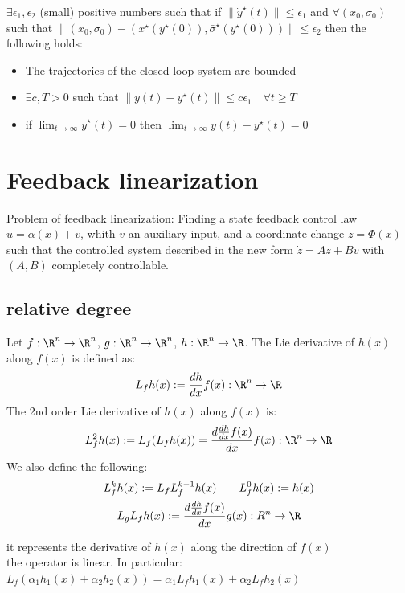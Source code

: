 \documentclass[english]{lectures}
\begin{document}
\begin{result}
    $\exists \epsilon_1, \epsilon_2$ (small) positive numbers such that if $\|\dot{y}^\star(t)\|\leq\epsilon_1$ and $\forall (x_0,\sigma_0)$ such that $\|(x_0,\sigma_0)-(x^\star(y^\star(0)),\bar{\sigma}^\star(y^\star(0)))\|\leq\epsilon_2$ then the following holds:
    \begin{itemize}
        \item The trajectories of the closed loop system are bounded
        \item $\exists c,T>0$ such that $\|y(t)-y^\star(t)\|\leq c\epsilon_1 \quad \forall t \geq T$
        \item if $\lim_{t\to\infty}\dot{y}^\star(t)=0$ then $\lim_{t\to\infty}y(t)-y^\star(t)=0$
        \end{itemize}
\end{result}

\chapter{Feedback linearization}
Problem of feedback linearization: Finding a state feedback control law $u=\alpha(x)+v$, whith $v$ an auxiliary input, and a coordinate change $z=\Phi(x)$ such that the controlled system described in the new form $\dot{z}=Az+Bv$ with $(A,B)$ completely controllable.
\section{relative degree}
\begin{definition}
    Let $f:\R^n\to\R^n$, $g:\R^n\to\R^n$, $h:\R^n\to\R$. The Lie derivative of $h(x)$ along $f(x)$ is defined as:
    \[
        L_fh(x):=\frac{dh}{dx}f(x):\R^n\to\R
    \]
    The 2nd order Lie derivative of $h(x)$ along $f(x)$ is:
    \[
        L_f^2h(x):=L_f(L_fh(x))=\frac{d\frac{dh}{dx}f(x)}{dx}f(x):\R^n\to\R
    \]
    We also define the following:
    \begin{gather*}
        L_f^kh(x):=L_fL_f^{k-1}h(x) \qquad L_f^0h(x):=h(x)\\
        L_gL_fh(x):=\frac{d\frac{dh}{dx}f(x)}{dx}g(x):R^n\to\R
    \end{gather*}
\end{definition}
\begin{observation}
    it represents the derivative of $h(x)$ along the direction of $f(x)$\\
    the operator is linear. In particular: $L_f(\alpha_1h_1(x)+\alpha_2h_2(x))=\alpha_1L_fh_1(x)+\alpha_2L_fh_2(x)$
\end{observation}
\end{document}
